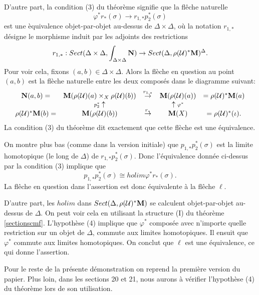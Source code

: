 \documentclass[12pt]{article}
\newcommand{\mm}{{\bf M}}
\newcommand{\nn}{{\bf N}}
\newcommand{\Uu}{{\cal U}}
\begin{document}
D'autre part, la condition (3) du th\'eor\`eme signifie que la 
fl\^eche naturelle
$$
\varphi ^{\ast}r_{\ast} (\sigma ) \rightarrow 
r_{1,\ast} p_2^{\ast} (\sigma )
$$
est une \`equivalence objet-par-objet au-dessus de 
$\Delta \times \Delta$, o\`u
la notation $r_{1,\ast}$ d\'esigne le morphisme induit par
les adjoints des restrictions
$$
r_{1,\ast} : 
Sect (\Delta \times \Delta , \int _{\Delta \times \Delta}\nn )
\rightarrow
Sect (\Delta , \rho (\Uu )^{\ast} \mm )^{\Delta}.
$$
Pour voir cela, fixons $(a,b)\in \Delta \times \Delta$. Alors la fl\`eche 
en question au point $(a,b)$ est la fl\`eche naturelle entre les deux
compos\'es dans le diagramme suivant:
$$
\begin{array}{ccccc}
\nn (a,b) = & \mm (\rho (\Uu )(a) \times _X \rho (\Uu )(b) )
& \stackrel{r_{1,\ast}}{\rightarrow} & \mm (\rho (\Uu )(a)) & 
= \rho (\Uu )^{\ast} \mm (a) \\
& {\scriptstyle p_2^{\ast}}\uparrow  && \uparrow {\scriptstyle \varphi ^{\ast}}
& \\
\rho (\Uu )^{\ast}\mm (b) = & \mm (\rho (\Uu )(b)) &
\stackrel{r_{\ast}}{\rightarrow} & \mm (X) & = \rho (\Uu )^{\ast}(\iota ).
\end{array}
$$
La condition (3) du th\'eor\`eme dit exactement que cette fl\`eche est une
\'equivalence.


On montre plus bas (comme dans la version initiale) 
que $p _{1,\ast}p_2^{\ast} (\sigma )$ est la
limite homotopique (le long de $\Delta$) de 
$r_{1,\ast} p_2^{\ast} (\sigma )$.  Donc l'\'equivalence donn\'ee ci-dessus
par la condition (3) implique que 
$$
p _{1,\ast}p_2^{\ast} (\sigma )\cong 
holim \varphi ^{\ast} r_{\ast} (\sigma ).
$$
La fl\^eche en question dans l'assertion est donc \'equivalente \`a
la fl\^eche $\ell$.

D'autre part, les $holim$ dans 
$Sect (\Delta , \rho (\Uu )^{\ast} \mm )$ se calculent objet-par-objet
au-dessus de $\Delta$. On peut voir cela en utilisant la structure (I)
du th\'eor\`eme \ref{sectionscmf}. L'hypoth\`ese (4) implique que
$\varphi ^{\ast}$ compos\'ee avec n'importe quelle restriction sur un objet
de $\Delta$, commute aux limites homotopiques. Il ensuit que $\varphi ^{\ast}$ 
commute
aux limites homotopiques. 
On conclut que $\ell$ est une \'equivalence, ce qui donne l'assertion.


Pour le reste de la pr\'esente d\'emonstration on reprend 
la premi\`ere version du papier. Plus loin, dans
les sections 20 et 21, nous aurons \`a v\'erifier l'hypoth\`ese
(4) du th\'eor\`eme lors de son utilisation. 
\end{document}
